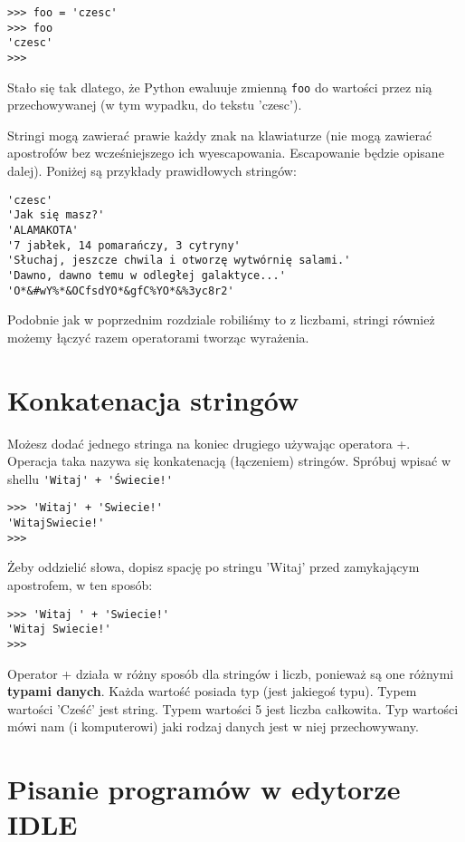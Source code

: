 \documentclass{book}
\begin{document}
\begin{lstlisting}
>>> foo = 'czesc'
>>> foo
'czesc'
>>>
\end{lstlisting}

Stało się tak dlatego, że Python ewaluuje zmienną \lstinline{foo} do wartości przez nią przechowywanej (w tym wypadku, do tekstu 'czesc').

Stringi mogą zawierać prawie każdy znak na klawiaturze (nie mogą zawierać apostrofów bez wcześniejszego ich wyescapowania. Escapowanie będzie opisane dalej). Poniżej są przykłady prawidłowych stringów:


\begin{lstlisting}
'czesc'
'Jak się masz?'
'ALAMAKOTA'
'7 jabłek, 14 pomarańczy, 3 cytryny'
'Słuchaj, jeszcze chwila i otworzę wytwórnię salami.'
'Dawno, dawno temu w odległej galaktyce...'
'O*&#wY%*&OCfsdYO*&gfC%YO*&%3yc8r2'
\end{lstlisting}

Podobnie jak w poprzednim rozdziale robiliśmy to z liczbami, stringi również możemy łączyć razem operatorami tworząc wyrażenia.

\section{Konkatenacja stringów}

Możesz dodać jednego stringa na koniec drugiego używając operatora +. Operacja taka nazywa się konkatenacją (łączeniem) stringów. Spróbuj wpisać w shellu \lstinline{'Witaj' + 'Świecie!'}

\begin{lstlisting}
>>> 'Witaj' + 'Swiecie!'
'WitajSwiecie!'
>>>
\end{lstlisting}

Żeby oddzielić słowa, dopisz spację po stringu 'Witaj' przed zamykającym apostrofem, w ten sposób:

\begin{lstlisting}
>>> 'Witaj ' + 'Swiecie!'
'Witaj Swiecie!'
>>> 
\end{lstlisting}

Operator + działa w różny sposób dla stringów i liczb, ponieważ są one różnymi {\bf typami danych}. Każda wartość posiada typ (jest jakiegoś typu). Typem wartości 'Cześć' jest string. Typem wartości 5 jest liczba całkowita. Typ wartości mówi nam (i komputerowi) jaki rodzaj danych jest w niej przechowywany. 

\section{Pisanie programów w edytorze IDLE}
\end{document}
